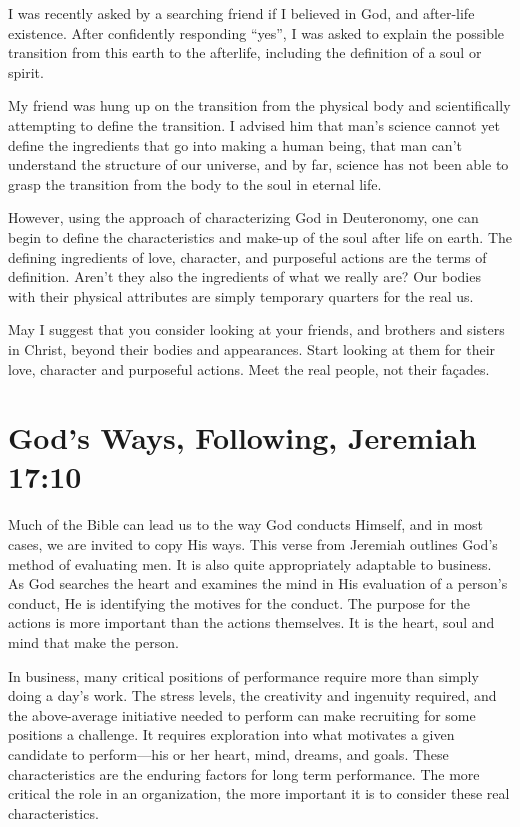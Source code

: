 \documentclass[12pt]{memoir}
\begin{document}
I was recently asked by a searching friend if I believed in
God, and after-life existence. After confidently responding ``yes'', I
was asked to explain the possible transition from this earth to the
afterlife, including the definition of a soul or spirit.

My friend was hung up on the transition from the physical body and scientifically
attempting to define the transition. I advised him that man's science
cannot yet define the ingredients that go into making a human being,
that man can't understand the structure of our universe, and by far,
science has not been able to grasp the transition from the body to
the soul in eternal life.

However, using the approach of characterizing God in Deuteronomy, one can begin to define the characteristics and make-up of the soul after life on earth. The defining ingredients of love, character, and purposeful actions are the terms of definition.
Aren't they also the ingredients of what we really are? Our bodies with their physical attributes are simply temporary quarters for the real us. 

May I suggest that you consider looking at your friends, and brothers
and sisters in Christ, beyond their bodies and appearances. Start looking at them for their love, character and purposeful actions. Meet the real people, not their façades.


\section[God's Ways, Following]{God's Ways, Following, Jeremiah 17:10}

Much of the Bible can lead us to the way God conducts Himself, and
in most cases, we are invited to copy His ways. This verse from Jeremiah
outlines God's method of evaluating men. It is also quite appropriately adaptable to business. As God searches the heart and examines
the mind in His evaluation of a person's conduct, He is identifying
the motives for the conduct. The purpose for the actions is more important
than the actions themselves. It is the heart, soul and mind that
make the person. 

In business, many critical positions of performance require more than
simply doing a day's work. The stress levels, the creativity and ingenuity required, and the above-average initiative needed to perform can make recruiting for some positions a challenge. It requires exploration into what motivates a given candidate to perform---his or her heart,
mind, dreams, and goals. These characteristics are the enduring factors
for long term performance. The more critical the role in an organization,
the more important it is to consider these real characteristics.
\end{document}

